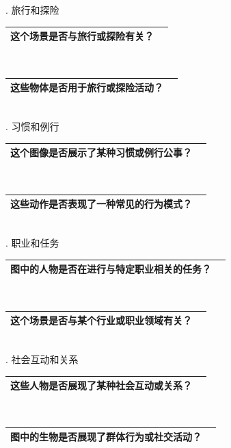 \documentclass[12pt]{book}
\begin{document}
. 旅行和探险

\begin{tabular}{|p{15cm}|p{3cm}|}
	\hline
这个场景是否与旅行或探险有关？\\
	\hline
\end{tabular}\\



\begin{tabular}{|p{15cm}|p{3cm}|}
	\hline
这些物体是否用于旅行或探险活动？\\
	\hline
\end{tabular}\\


. 习惯和例行

\begin{tabular}{|p{15cm}|p{3cm}|}
	\hline
这个图像是否展示了某种习惯或例行公事？\\
	\hline
\end{tabular}\\


\begin{tabular}{|p{15cm}|p{3cm}|}
	\hline
这些动作是否表现了一种常见的行为模式？\\
	\hline
\end{tabular}\\


. 职业和任务

\begin{tabular}{|p{15cm}|p{3cm}|}
	\hline
图中的人物是否在进行与特定职业相关的任务？\\
	\hline
\end{tabular}\\



\begin{tabular}{|p{15cm}|p{3cm}|}
	\hline
这个场景是否与某个行业或职业领域有关？\\
	\hline
\end{tabular}\\


. 社会互动和关系

\begin{tabular}{|p{15cm}|p{3cm}|}
	\hline
这些人物是否展现了某种社会互动或关系？\\
	\hline
\end{tabular}\\


\begin{tabular}{|p{15cm}|p{3cm}|}
	\hline
图中的生物是否展现了群体行为或社交活动？\\
	\hline
\end{tabular}\\
\end{document}
